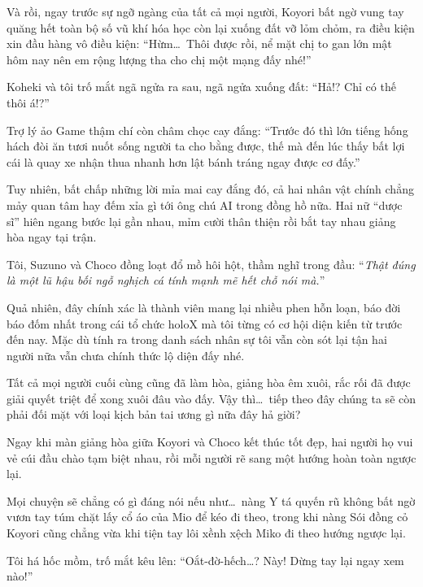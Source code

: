 \documentclass[../main.tex]{subfiles}
\begin{document}
Và rồi, ngay trước sự ngỡ ngàng của tất cả mọi người, Koyori bất ngờ vung tay quăng hết toàn bộ số vũ khí hóa học còn lại xuống đất vỡ lỏm chỏm, ra điều kiện xin đầu hàng vô điều kiện: ``Hừm\dots\ Thôi được rồi, nể mặt chị to gan lớn mật hôm nay nên em rộng lượng tha cho chị một mạng đấy nhé!''

Koheki và tôi trố mắt ngã ngửa ra sau, ngã ngửa xuống đất: ``Hả!? Chỉ có thế thôi á!?''

Trợ lý ảo Game thậm chí còn châm chọc cay đắng: ``Trước đó thì lớn tiếng hống hách đòi ăn tươi nuốt sống người ta cho bằng được, thế mà đến lúc thấy bất lợi cái là quay xe nhận thua nhanh hơn lật bánh tráng ngay được cơ đấy.''

Tuy nhiên, bất chấp những lời mỉa mai cay đắng đó, cả hai nhân vật chính chẳng mảy quan tâm hay đếm xỉa gì tới ông chú AI trong đồng hồ nữa. Hai nữ ``dược sĩ'' hiên ngang bước lại gần nhau, mỉm cười thân thiện rồi bắt tay nhau giảng hòa ngay tại trận.

Tôi, Suzuno và Choco đồng loạt đổ mồ hôi hột, thầm nghĩ trong đầu: ``\textit{Thật đúng là một lũ hậu bối ngỗ nghịch cá tính mạnh mẽ hết chỗ nói mà.}''

Quả nhiên, đây chính xác là thành viên mang lại nhiều phen hỗn loạn, báo đời báo đốm nhất trong cái tổ chức holoX mà tôi từng có cơ hội diện kiến từ trước đến nay. Mặc dù tính ra trong danh sách nhân sự tôi vẫn còn sót lại tận hai người nữa vẫn chưa chính thức lộ diện đấy nhé.

Tất cả mọi người cuối cùng cũng đã làm hòa, giảng hòa êm xuôi, rắc rối đã được giải quyết triệt để xong xuôi đâu vào đấy. Vậy thì\dots\ tiếp theo đây chúng ta sẽ còn phải đối mặt với loại kịch bản tai ương gì nữa đây hả giời?

\omk

Ngay khi màn giảng hòa giữa Koyori và Choco kết thúc tốt đẹp, hai người họ vui vẻ cúi đầu chào tạm biệt nhau, rồi mỗi người rẽ sang một hướng hoàn toàn ngược lại.

Mọi chuyện sẽ chẳng có gì đáng nói nếu như\dots\ nàng Y tá quyến rũ không bất ngờ vươn tay túm chặt lấy cổ áo của Mio để kéo đi theo, trong khi nàng Sói đồng cỏ Koyori cũng chẳng vừa khi tiện tay lôi xềnh xệch Miko đi theo hướng ngược lại.


Tôi há hốc mồm, trố mắt kêu lên: ``Oắt-đờ-hếch\dots? Này! Dừng tay lại ngay xem nào!''
\end{document}
